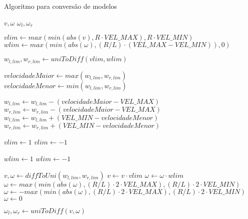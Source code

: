 \begin{frame}
	\begin{block}{Algoritmo para conversão de modelos}
	\vspace{-0.45cm}
	\begin{algorithm}[H]
		\scriptsize
		\caption{Uniciclo para Acionamento Diferencial priorizando $\omega$}
		\begin{algorithmic}[1]
			\REQUIRE $v, \omega$
			\ENSURE $\omega_l, \omega_r$
			
				\STATE $vlim \leftarrow max(min(abs(v), R \cdot VEL\_MAX), R \cdot VEL\_MIN)$
				\STATE $wlim \leftarrow max(min(abs(\omega), (R/L) \cdot (VEL\_MAX - VEL\_MIN)), 0)$
				
				\STATE $w_{l,lim}, w_{r,lim} \leftarrow uniToDiff(vlim, wlim)$
				
				\STATE $ velocidadeMaior \leftarrow max(w_{l,lim}, w_{r,lim})$
				\STATE $ velocidadeMenor \leftarrow min(w_{l,lim}, w_{r,lim})$
			
					\STATE $w_{l,lim} \leftarrow w_{l,lim} - (velocidadeMaior - VEL\_MAX)$
					\STATE $w_{r,lim} \leftarrow w_{r,lim} - (velocidadeMaior - VEL\_MAX)$
					\STATE $w_{l,lim} \leftarrow w_{l,lim} + (VEL\_MIN - velocidadeMenor)$
					\STATE $w_{r,lim} \leftarrow w_{r,lim} + (VEL\_MIN - velocidadeMenor)$
				\ENDIF
				
					\STATE $vlim \leftarrow 1$
				\ELSE
					\STATE $vlim \leftarrow -1$
				\ENDIF
				
				\vspace{-6.5cm}
					\STATE $wlim \leftarrow 1$
				\ELSE
					\STATE $wlim \leftarrow -1$
				\ENDIF
					
				\STATE $v,\omega \leftarrow diffToUni(w_{l,lim},w_{r,lim})$
				\STATE $v \leftarrow v \cdot vlim$
				\STATE $\omega \leftarrow \omega \cdot wlim$
			\ELSE
						\STATE $\omega \leftarrow max(min(abs(\omega),(R/L) \cdot 2 \cdot VEL\_MAX),(R/L) \cdot 2 \cdot VEL\_MIN)$ 
					\ELSE
						\STATE $\omega \leftarrow -max(min(abs(\omega),(R/L) \cdot 2 \cdot VEL\_MAX),(R/L) \cdot 2 \cdot VEL\_MIN)$
					\ENDIF
				\ELSE
					\STATE $\omega \leftarrow 0$
				\ENDIF
			\ENDIF
				
			\STATE $\omega_l, \omega_r \leftarrow uniToDiff(v,\omega)$
		\end{algorithmic}
	\end{algorithm}
	\end{block}
\end{frame}


